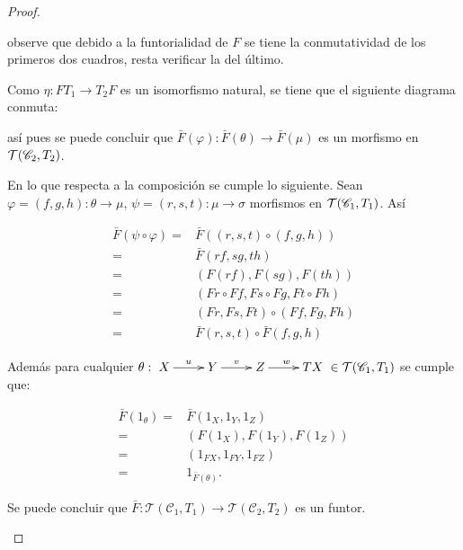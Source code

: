 \documentclass{article}
\begin{document}
\begin{enumerate}[label=\textbf{Ej \arabic*.}]
\begin{proof}
\begin{enumerate}
				observe que debido a la funtorialidad de $F$ se tiene la conmutatividad de los primeros dos cuadros, resta verificar la del \'ultimo.
				
				\bigskip
				
				Como $\eta:FT_{1}\to T_{2}F$ es un isomorfismo natural, se tiene que el siguiente diagrama conmuta:
				
				\begin{center}
				\end{center}
				
				as\'i pues se puede concluir que $\bar{F}(\varphi):\bar{F}(\theta)\to \bar{F}(\mu)$ es un morfismo en $\mathcal{T}(\mathscr{C}_{2},T_{2})$.
				
				\bigskip
				
				En lo que respecta a la composici\'on se cumple lo siguiente. Sean $\varphi=(f,g,h):\theta \to \mu$, $\psi=(r,s,t):\mu \to \sigma$ morfismos en $\mathcal{T}(\mathscr{C}_{1},T_{1})$. As\'i
				
				\begin{align*}
					\bar{F}(\psi \circ \varphi) =& \bar{F}((r,s,t)\circ (f,g,h))\\
					=& \bar{F}(rf,sg,th)\\
					=& (F(rf),F(sg),F(th))\\
					=& (Fr\circ Ff,Fs\circ Fg,Ft\circ Fh)\\
					=& (Fr,Fs,Ft)\circ (Ff,Fg,Fh)\\
					=& \bar{F}(r,s,t)\circ \bar{F}(f,g,h)
				\end{align*}
				
				Adem\'as para cualquier $\theta : \xymatrix{X\ar[r]^u & Y\ar[r]^v & Z\ar[r]^w & TX } \in \mathcal{T}(\mathscr{C}_{1},T_{1})$ se cumple que:
				
				\begin{align*}
					\bar{F}(1_{\theta}) =& \bar{F}(1_{X},1_{Y},1_{Z})\\
					=& ( F(1_{X}),F(1_{Y}),F(1_{Z}) )\\
					=& (1_{FX},1_{FY},1_{FZ})\\
					=& 1_{\bar{F}(\theta)}.
				\end{align*}
				
				Se puede concluir que $\bar{F}:\mathcal{T}(\mathscr{C}_{1},T_{1})\to \mathcal{T}(\mathscr{C}_{2},T_{2})$ es un funtor.
				

\end{enumerate}
\end{proof}
\end{enumerate}
\end{document}
